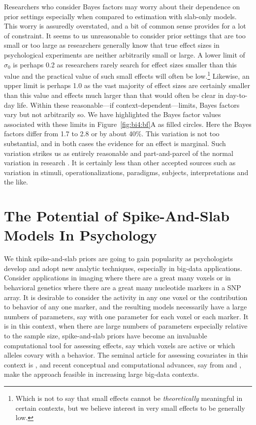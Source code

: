 Researchers who consider Bayes factors may worry about their dependence on prior settings especially when compared to estimation with slab-only models.  This worry is assuredly overstated, and a bit of common sense provides for a lot of constraint. It seems to us unreasonable to consider prior settings that are too small or too large as researchers generally know that true effect sizes in psychological experiments are neither arbitrarily small or large.  A lower limit of $\sigma_0$ is perhaps 0.2 as researchers rarely search for effect sizes smaller than this value and the practical value of such small effects will often be low.\footnote{Which is not to say that small effects cannot be \emph{theoretically} meaningful in certain contexts, but we believe interest in very small effects to be generally low.}  Likewise, an upper limit is perhaps 1.0 as the vast majority of effect sizes are certainly smaller than this value and effects much larger than that would often be clear in day-to-day life.     Within these reasonable---if context-dependent---limits, Bayes factors vary but not arbitrarily so.  We have highlighted the Bayes factor values associated with these limits in Figure~\ref{fig:bi4:bf}A as filled circles.  Here the Bayes factors differ from 1.7 to 2.8 or by about 40\%.  This variation is not too substantial, and in both cases the evidence for an effect is marginal.  Such variation strikes us as entirely reasonable and part-and-parcel of the normal variation in research .  It is certainly less than other accepted sources such as variation in stimuli, operationalizations, paradigms, subjects, interpretations and the like.

\section{The Potential of Spike-And-Slab Models In Psychology}
We think spike-and-slab priors are going to gain popularity as psychologists develop and adopt new analytic techniques, especially in big-data applications.  Consider applications in imaging where there are a great many voxels or in behavioral genetics where there are a great many nucleotide markers in a SNP array.  It is desirable to consider the activity in any one voxel or the contribution to behavior of any one marker, and the resulting models necessarily have a large numbers of parameters, say with one parameter for each voxel or each marker.  It is in this context, when there are large numbers of parameters especially relative to the sample size, spike-and-slab priors have  become an invaluable computational tool for assessing effects, say which voxels are active or which alleles covary with a behavior.   The seminal article for assessing covariates in this context is , and recent conceptual and computational advances, say from  and , make the approach feasible in increasing large big-data contexts. 

